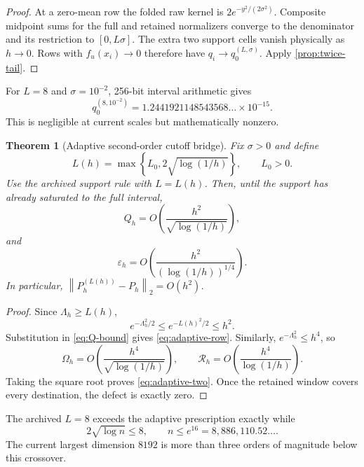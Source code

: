 \documentclass[11pt]{article}
\newtheorem{theorem}{Theorem}[section]
\theoremstyle{definition}
\theoremstyle{remark}
\newcommand{\norm}[1]{\left\lVert #1\right\rVert}
\begin{document}
\begin{proof}
At a zero-mean row the folded raw kernel is
$2e^{-y^2/(2\sigma^2)}$.  Composite midpoint sums for the full and retained
normalizers converge to the denominator and its restriction to
$[0,L\sigma]$.  The extra two support cells vanish physically as $h\to0$.
Rows with $f_u(x_i)\to0$ therefore have $q_i\to q_0^{(L,\sigma)}$.  Apply
\cref{prop:twice-tail}.
\end{proof}

For $L=8$ and $\sigma=10^{-2}$, 256-bit interval arithmetic gives
\begin{equation}
q_0^{(8,10^{-2})}
=1.2441921148543568\ldots\times10^{-15}.
\label{eq:eight-tail-value}
\end{equation}
This is negligible at current scales but mathematically nonzero.

\begin{theorem}[Adaptive second-order cutoff bridge]
\label{thm:adaptive}
Fix $\sigma>0$ and define
\begin{equation}
L(h)=\max\left\{L_0,2\sqrt{\log(1/h)}\right\},
\qquad L_0>0.
\label{eq:adaptive-schedule}
\end{equation}
Use the archived support rule with $L=L(h)$.  Then, until the support has
already saturated to the full interval,
\begin{equation}
Q_h=O\!\left(
\frac{h^2}{\sqrt{\log(1/h)}}
\right),
\label{eq:adaptive-row}
\end{equation}
and
\begin{equation}
\varepsilon_h
=O\!\left(
\frac{h^2}{(\log(1/h))^{1/4}}
\right).
\label{eq:adaptive-two}
\end{equation}
In particular, $\norm{P_h^{(L(h))}-P_h}_2=O(h^2)$.
\end{theorem}

\begin{proof}
Since $\Lambda_h\ge L(h)$,
\[
e^{-\Lambda_h^2/2}\le e^{-L(h)^2/2}\le h^2.
\]
Substitution in \eqref{eq:Q-bound} gives
\eqref{eq:adaptive-row}.  Similarly,
$e^{-\Lambda_h^2}\le h^4$, so
\[
\Omega_h=O\!\left(
\frac{h^4}{\sqrt{\log(1/h)}}
\right),
\qquad
\mathcal R_h=O\!\left(
\frac{h^4}{\log(1/h)}
\right).
\]
Taking the square root proves \eqref{eq:adaptive-two}.  Once the retained
window covers every destination, the defect is exactly zero.
\end{proof}

The archived $L=8$ exceeds the adaptive prescription exactly while
\[
2\sqrt{\log n}\le8,
\qquad n\le e^{16}=8{,}886{,}110.52\ldots.
\]
The current largest dimension $8192$ is more than three orders of magnitude
below this crossover.
\end{document}
